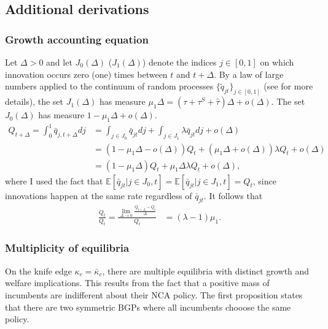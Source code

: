 \documentclass[ecta,nameyear,final]{econsocart}
\theoremstyle{definition}
\begin{document}
\subsection{Additional derivations}

\subsubsection{Growth accounting equation}\label{appendix:model:growth_accounting_equation}

Let $\Delta > 0$ and let $J_0(\Delta)$ ($J_1(\Delta)$) denote the indices $j\in [0,1]$ on which innovation occurs zero (one) times between $t$ and $t+\Delta$. By a law of large numbers applied to the continuum of random processes $\{\tilde{q}_{jt}\}_{j \in [0,1]}$ (see \cite{uhlig_law_1996} for more details), the set $J_1(\Delta)$ has measure $\mu_1 \Delta = (\tau + \tau^S + \hat{\tau})\Delta + o(\Delta)$. The set $J_0(\Delta)$ has measure $1 - \mu_1 \Delta + o(\Delta)$. 
\begin{align*}
	Q_{t+\Delta} = \int_0^1 \bar{q}_{j,t+\Delta} dj &= \int_{j \in J_0} \bar{q}_{jt} dj + \int_{j \in J_1} \lambda \bar{q}_{jt} dj + o(\Delta) \\
	&= (1 - \mu_1\Delta - o(\Delta)) Q_t + (\mu_1 \Delta + o(\Delta) ) \lambda Q_t + o(\Delta) \\
	&= (1 - \mu_1\Delta) Q_t + \mu_1\Delta \lambda Q_t + o(\Delta),
\end{align*}
where I used the fact that $\mathbb{E}[\bar{q}_{jt} | j \in J_0, t]  = \mathbb{E}[\bar{q}_{jt} | j \in J_1, t] = Q_t$, since innovations happen at the same rate regardless of $\bar{q}_{jt}$. It follows that
\begin{align*}
	\frac{\dot{Q}_t}{Q_t} = \frac{\lim_{\Delta \to 0} \frac{Q_{t+\Delta} - Q_t}{\Delta}}{Q_t} &= (\lambda - 1)\mu_1.
\end{align*}

\subsubsection{Multiplicity of equilibria}\label{appendix:model:multiplicity_of_equilibria}

On the knife edge $\kappa_c = \bar{\kappa}_c$, there are multiple equilibria with distinct growth and welfare implications. This results from the fact that a positive mass of incumbents are indifferent about their NCA policy. The first proposition states that there are two symmetric BGPs where all incumbents chooose the same policy.
\end{document}
